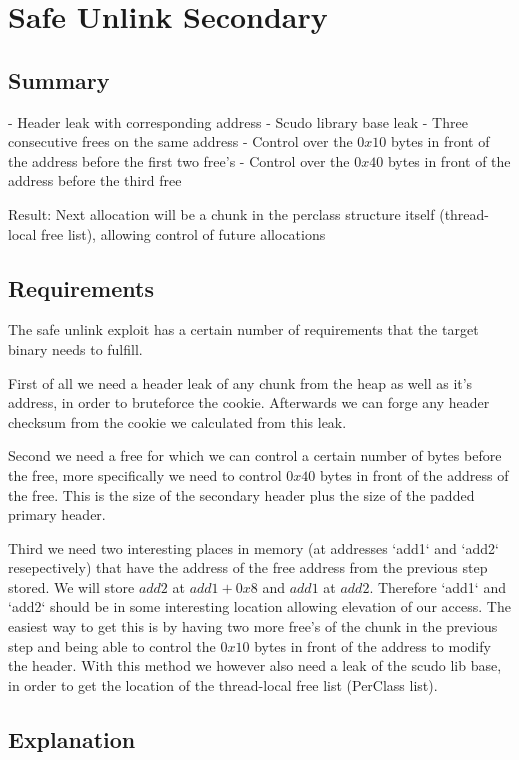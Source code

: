 \documentclass[a4paper,11pt,oneside]{report}
\begin{document}
\section{Safe Unlink Secondary}


\subsection{Summary}

- Header leak with corresponding address
- Scudo library base leak
- Three consecutive frees on the same address
  - Control over the $0x10$ bytes in front of the address before the first two free's
  - Control over the $0x40$ bytes in front of the address before the third free

Result:
Next allocation will be a chunk in the perclass structure itself (thread-local free list), allowing control of future allocations


\subsection{Requirements}

The safe unlink exploit has a certain number of requirements that the target binary needs to fulfill.

First of all we need a header leak of any chunk from the heap as well as it's address, in order to bruteforce the cookie. Afterwards we can forge any header checksum from the cookie we calculated from this leak.

Second we need a free for which we can control a certain number of bytes before the free, more specifically we need to control $0x40$ bytes in front of the address of the free. This is the size of the secondary header plus the size of the padded primary header.

Third we need two interesting places in memory (at addresses `add1` and `add2` resepectively) that have the address of the free address from the previous step stored. We will store $add2$ at $add1+0x8$ and $add1$ at $add2$. Therefore `add1` and `add2` should be in some interesting location allowing elevation of our access.  
The easiest way to get this is by having two more free's of the chunk in the previous step and being able to control the $0x10$ bytes in front of the address to modify the header. With this method we however also need a leak of the scudo lib base, in order to get the location of the thread-local free list (PerClass list).

\subsection{Explanation}
\end{document}
